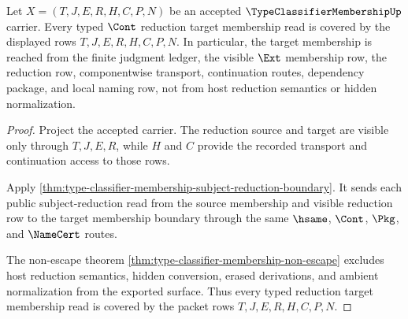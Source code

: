 \begin{theorem}
\label{thm:type-classifier-membership-reduction-target-coverage}
Let $X=(T,J,E,R,H,C,P,N)$ be an accepted $\TypeClassifierMembershipUp$ carrier. Every typed $\Cont$ reduction target membership read is covered by the displayed rows $T,J,E,R,H,C,P,N$. In particular, the target membership is reached from the finite judgment ledger, the visible $\Ext$ membership row, the reduction row, componentwise transport, continuation routes, dependency package, and local naming row, not from host reduction semantics or hidden normalization.
\end{theorem}
\begin{proof}
Project the accepted carrier. The reduction source and target are visible only through $T,J,E,R$, while $H$ and $C$ provide the recorded transport and continuation access to those rows.

Apply \autoref{thm:type-classifier-membership-subject-reduction-boundary}. It sends each public subject-reduction read from the source membership and visible reduction row to the target membership boundary through the same $\hsame$, $\Cont$, $\Pkg$, and $\NameCert$ routes.

The non-escape theorem \autoref{thm:type-classifier-membership-non-escape} excludes host reduction semantics, hidden conversion, erased derivations, and ambient normalization from the exported surface. Thus every typed reduction target membership read is covered by the packet rows $T,J,E,R,H,C,P,N$.
\end{proof}

